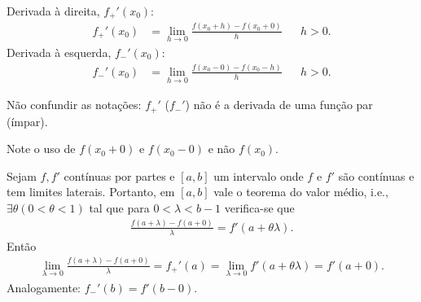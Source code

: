 \begin{defi}
    Derivada \`{a} direita, $f_+'(x_0)$:
    \begin{align*}
        f_+'(x_0) &= \lim_{h \to 0} \frac{f(x_0 + h) - f(x_0 + 0)}{h} && h > 0.
    \end{align*}
    Derivada \`{a} esquerda, $f_-'(x_0)$:
    \begin{align*}
        f_-'(x_0) &= \lim_{h \to 0} \frac{f(x_0 - 0) - f(x_0 - h)}{h} && h > 0.
    \end{align*}
\end{defi}
\begin{obs}
    N\~{a}o confundir as nota\c{c}\~{o}es: $f_+'$ ($f_-'$) n\~{a}o \'{e} a derivada de uma fun\c{c}\~{a}o par (\'{i}mpar).
\end{obs}
\begin{obs}
    Note o uso de $f(x_0 + 0)$ e $f(x_0 - 0)$ e n\~{a}o $f(x_0)$.
\end{obs}

Sejam $f, f'$ cont\'{i}nuas por partes e $[a,b]$ um intervalo onde $f$ e $f'$ s\~{a}o cont\'{i}nuas e tem limites laterais. Portanto, em $[a,b]$ vale o teorema do valor m\'{e}dio, i.e., $\exists \theta (0 < \theta < 1)$ tal que para $0 < \lambda < b - 1$ verifica-se que
\begin{align*}
    \frac{f(a + \lambda) - f(a + 0)}{\lambda} = f'(a + \theta \lambda).
\end{align*}
Ent\~{a}o
\begin{align*}
    \lim_{\lambda \to 0} \frac{f(a + \lambda) - f(a + 0)}{\lambda} = f_+'(a) = \lim_{\lambda \to 0} f'(a + \theta \lambda) = f'(a + 0).
\end{align*}
Analogamente: $f_-'(b) = f'(b - 0)$.

